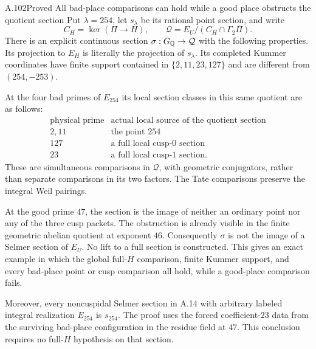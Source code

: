 \begin{statement}{A.102}{Proved}
{All bad-place comparisons can hold while a good place obstructs the quotient section}
Put $\lambda=254$, let $s_\lambda$ be its rational point
section, and write
\[
 C_H=\ker(\Pi\longrightarrow H),\qquad
 \mathcal Q=E_U/(C_H\cap\Gamma_2\Pi).
\tag{A.102.1}
\]
There is an explicit continuous section
$\sigma:G_\mathbb Q\to\mathcal Q$ with the following properties.
Its projection to $E_H$ is literally the projection of
$s_\lambda$.  Its completed Kummer coordinates have finite
support contained in $\{2,11,23,127\}$ and are different
from $(254,-253)$.

At the four bad primes of $E_{254}$ its local section
classes in this same quotient are as follows:
\[
\begin{array}{c|c}
 \text{physical prime}&\text{actual local source of the quotient section}\\ \hline
 2,11&\text{the point }254\\
 127&\text{a full local cusp-0 section}\\
 23&\text{a full local cusp-1 section}.
\end{array}
\tag{A.102.2}
\]
These are simultaneous comparisons in $\mathcal Q$,
with geometric conjugators, rather than separate
comparisons in its two factors.  The Tate comparisons
preserve the integral Weil pairings.

At the good prime $47$, the section is the image of
neither an ordinary point nor any of the three cusp
packets.  The obstruction is already visible in the
finite geometric abelian quotient at exponent $46$.
Consequently $\sigma$ is not the image of a Selmer section
of $E_U$.  No lift to a full section is constructed.
This gives an exact example in which the global full-$H$
comparison, finite Kummer support, and every bad-place
point or cusp comparison all hold, while a good-place
comparison fails.

Moreover, every noncuspidal Selmer section in A.14 with
arbitrary labeled integral realization $E_{254}$ is
$s_{254}$.  The proof uses the forced coefficient-$23$
data from the surviving bad-place configuration in
the residue field at $47$.  This conclusion requires
no full-$H$ hypothesis on that section.
\end{statement}
